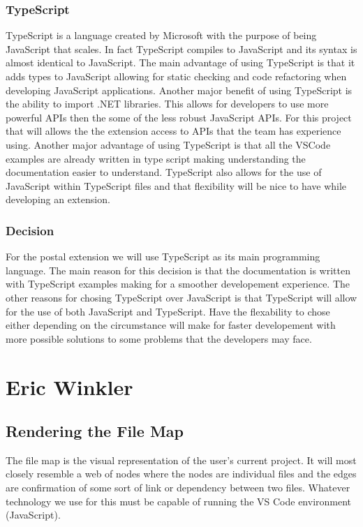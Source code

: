 \documentclass[letterpaper,10pt,titlepage,draftclsnofoot,onecolumn,onesided] {IEEEtran}
\begin{document}
\subsubsection{TypeScript}
TypeScript is a language created by Microsoft with the purpose of being \'JavaScript that scales.\' \cite{TypeScript}
In fact TypeScript compiles to JavaScript and its syntax is almost identical to JavaScript. 
The main advantage of using TypeScript is that it adds types to JavaScript allowing for static checking and code refactoring when developing JavaScript applications. \cite{TypeScript}
Another major benefit of using TypeScript is the ability to import .NET libraries. 
This allows for developers to use more powerful APIs then the some of the less robust JavaScript APIs. 
For this project that will allows the the extension access to APIs that the team has experience using.
Another major advantage of using TypeScript is that all the VSCode examples are already written in type script making understanding the documentation easier to understand. 
TypeScript also allows for the use of JavaScript within TypeScript files and that flexibility will be nice to have while developing an extension.
\subsubsection{Decision}
For the postal extension we will use TypeScript as its main programming language. 
The main reason for this decision is that the documentation is written with TypeScript examples making for a smoother developement experience. 
The other reasons for chosing TypeScript over JavaScript is that TypeScript will allow for the use of both JavaScript and TypeScript. 
Have the flexability to chose either depending on the circumstance will make for faster developement with more possible solutions to some problems that the developers may face. 


\section{Eric Winkler}
\subsection{Rendering the File Map}
The file map is the visual representation of the user's current project. 
It will most closely resemble a web of nodes where the nodes are individual files and the edges are confirmation of some sort of link or dependency between two files. 
Whatever technology we use for this must be capable of running the VS Code environment (JavaScript). \\
\end{document}
